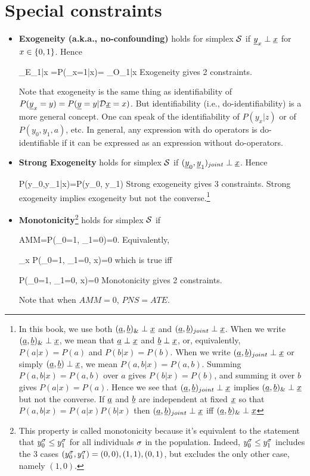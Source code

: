 \section{Special constraints}
\begin{itemize}
\item
{\bf Exogeneity (a.k.a., no-confounding)}
holds for simplex ${\cal S}$
if
${\underline{y}}_x\perp {\underline{x}}$ for $x\in\{0,1\}$.
 Hence

\beq
{}_{E_{1|x}}
=P(\rvy_x=1|x)=
_{O_{1|x}}
\quad {}
\eeq
Exogeneity gives {\color{red}2 constraints}.

Note that exogeneity
is the same thing as identifiability
of $P({\underline{y}}_x=y)=P({\underline{y}}=y|{\cal D}{\underline{x}}=x)$.
But identifiability
(i.e., do-identifiability) is a more
general concept. One can speak
of the identifiability of $P(y_x|z)$
or of $P(y_0, y_1, a)$, etc.
In general,
any expression with
do operators is do-identifiable
if it can be expressed
as an expression without
do-operators.

\item
{\bf Strong Exogeneity} holds
for simplex ${\cal S}$
if $({\underline{y}}_0, {\underline{y}}_1)_{joint}
\perp {\underline{x}}$. Hence

\beq
P(y_0,y_1|x)=P(y_0, y_1)
\label{eq-strong-exogen}
\eeq
Strong exogeneity gives {\color{red} 3 constraints}.
Strong exogeneity implies
exogeneity
but not the converse.\footnote{In
this book, we use both
$({\underline{a}}, {\underline{b}})_\&\perp {\underline{x}}$
and $({\underline{a}}, {\underline{b}})_{joint}\perp {\underline{x}}$.
When we write $({\underline{a}}, {\underline{b}})_\&\perp {\underline{x}}$,
we mean that
${\underline{a}}\perp {\underline{x}}$
and ${\underline{b}}\perp{\underline{x}}$,
or, equivalently,
$P(a|x)=P(a)$
and $P(b|x)=P(b)$.
When we write
$({\underline{a}}, {\underline{b}})_{joint}\perp {\underline{x}}$
or simply $({\underline{a}}, {\underline{b}})\perp {\underline{x}}$,
we mean $P(a,b|x)=P(a,b)$.
Summing
$P(a,b|x)=P(a,b)$
over $a$ gives
$P(b|x)=P(b)$,
and summing it
over $b$ gives
$P(a|x)=P(a)$.
Hence we see that
 $({\underline{a}}, {\underline{b}})_{joint}\perp {\underline{x}}$
implies
$({\underline{a}}, {\underline{b}})_\&\perp {\underline{x}}$
but not the converse.
If ${\underline{a}}$ and ${\underline{b}}$ are independent at
fixed ${\underline{x}}$ so that
$P(a,b|x)=P(a|x)P(b|x)$ then
$({\underline{a}}, {\underline{b}})_{joint}\perp {\underline{x}}$
iff
$({\underline{a}}, {\underline{b}})_\&\perp {\underline{x}}$
}
\item
{\bf Monotonicity}\footnote{
This property is called monotonicity
 because
it's equivalent to the statement
that $y_0^\sigma\leq y_1^\sigma$ for
all individuals $\sigma$
in the population.
Indeed, $y_0^\sigma\leq y_1^\sigma$
includes the 3 cases $(y_0^\sigma, y_1^\sigma)=
(0,0), (1, 1), (0,1)$, but
excludes the only other
case, namely $(1,0)$.}
 holds for simplex ${\cal S}$ if

\beq AMM=P(\rvy_0=1,
 \rvy_1=0)=0\eeq\;.
Equivalently,

\beq
\sum_x P(\rvy_0=1, \rvy_1=0, x)=0
\eeq
which is true iff

\beq
 P(\rvy_0=1, \rvy_1=0, x)=0\quad
{}
\eeq
Monotonicity gives {\color{red} 2
constraints}.

Note that when $AMM=0$, $PNS=ATE$.
\end{itemize}



